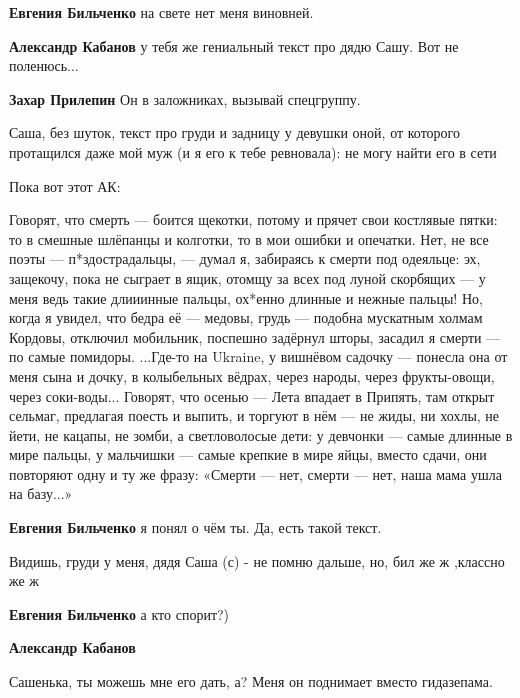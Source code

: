 \begin{itemize}
\begin{itemize}
\textbf{Евгения Бильченко} на свете нет меня виновней.


\textbf{Александр Кабанов} у тебя же гениальный текст про дядю Сашу. Вот не поленюсь...

\textbf{Захар Прилепин} Он в заложниках, вызывай спецгруппу.


Саша, без шуток, текст про груди и задницу у девушки оной, от которого
протащился даже мой муж (и я его к тебе ревновала): не могу найти его в сети


Пока вот этот АК: 

\begin{multicols}{2}
\obeycr
Говорят, что смерть — боится щекотки,
потому и прячет свои костлявые пятки:
то в смешные шлёпанцы и колготки,
то в мои ошибки и опечатки.
\smallskip
Нет, не все поэты — п*здострадальцы, —
думал я, забираясь к смерти под одеяльце:
эх, защекочу, пока не сыграет в ящик,
отомщу за всех под луной скорбящих —
у меня ведь такие длииинные пальцы,
ох*енно длинные и нежные пальцы!
\smallskip
Но, когда я увидел, что бедра её — медовы,
грудь — подобна мускатным холмам Кордовы,
отключил мобильник, поспешно задёрнул шторы,
засадил я смерти — по самые помидоры.
\smallskip
...Где-то на Ukraine, у вишнёвом садочку —
понесла она от меня сына и дочку,
в колыбельных вёдрах, через народы,
через фрукты-овощи, через соки-воды...
\smallskip
Говорят, что осенью — Лета впадает в Припять,
там открыт сельмаг, предлагая поесть и выпить,
и торгуют в нём — не жиды, ни хохлы, не йети,
не кацапы, не зомби, а светловолосые дети:
\smallskip
у девчонки — самые длинные в мире пальцы,
у мальчишки — самые крепкие в мире яйцы,
вместо сдачи, они повторяют одну и ту же фразу:
\smallskip
«Смерти — нет, смерти — нет,
наша мама ушла на базу...»
\restorecr
\end{multicols}

\textbf{Евгения Бильченко} я понял о чём ты. Да, есть такой текст.

Видишь, груди у меня, дядя Саша (с) - не помню дальше, но, бил же ж ,классно же ж

\textbf{Евгения Бильченко} а кто спорит?)

\textbf{Александр Кабанов} 

Сашенька, ты можешь мне его дать, а? Меня он поднимает вместо гидазепама.


\end{itemize}
\end{itemize}
